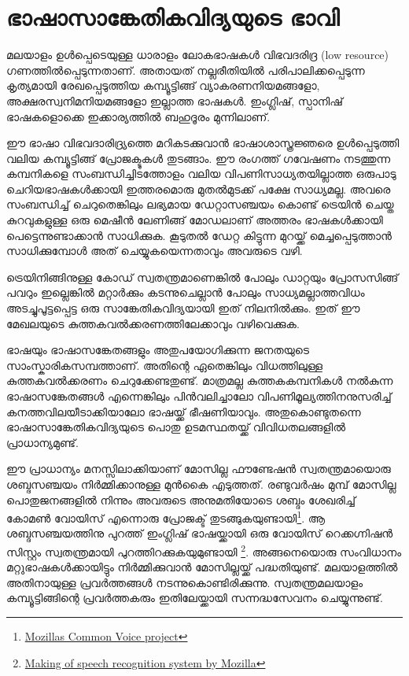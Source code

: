 \documentclass[12pt,twoside,a4paper]{article}
\begin{document}
\section{ഭാഷാസാങ്കേതികവിദ്യയുടെ ഭാവി}

മലയാളം ഉൾപ്പെടെയുള്ള ധാരാളം ലോകഭാഷകൾ വിഭവദരിദ്ര (low resource) ഗണത്തിൽപ്പെടുന്നതാണ്. അതായത് നല്ലരീതിയിൽ പരിപാലിക്കപ്പെടുന്ന കൃത്യമായി രേഖപ്പെടുത്തിയ കമ്പ്യൂട്ടിങ്ങ് വ്യാകരണനിയമങ്ങളോ, അക്ഷരസ്വനിമനിയമങ്ങളോ ഇല്ലാത്ത ഭാഷകൾ. ഇംഗ്ലിഷ്, സ്പാനിഷ് ഭാഷകളൊക്കെ ഇക്കാര്യത്തിൽ ബഹുദൂരം മുന്നിലാണ്.

ഈ ഭാഷാ വിഭവദാരിദ്ര്യത്തെ മറികടക്കുവാൻ ഭാഷാശാസ്ത്രജ്ഞരെ ഉൾപ്പെടുത്തി വലിയ കമ്പ്യൂട്ടിങ്ങ് പ്രോജക്ടുകൾ തുടങ്ങാം. ഈ രംഗത്ത് ഗവേഷണം നടത്തുന്ന കമ്പനികളെ സംബന്ധിച്ചിടത്തോളം വലിയ വിപണിസാധ്യതയില്ലാത്ത ഒരുപാടു ചെറിയഭാഷകൾക്കായി ഇത്തരമൊരു മുതൽമുടക്ക്  പക്ഷേ സാധ്യമല്ല. അവരെ സംബന്ധിച്ച് ചെറുതെങ്കിലും ലഭ്യമായ ഡേറ്റാസഞ്ചയം കൊണ്ട് ട്രെയിൻ ചെയ്ത കുറവുകളുള്ള ഒരു മെഷീൻ ലേണിങ്ങ്  മോഡലാണ് അത്തരം ഭാഷകൾക്കായി പെട്ടെന്നുണ്ടാക്കാൻ സാധിക്കുക. കൂടുതൽ ഡേറ്റ കിട്ടുന്ന മുറയ്ക്ക് മെച്ചപ്പെടുത്താൻ സാധിക്കുമ്പോൾ അത് ചെയ്യുകയെന്നതാവും അവരുടെ വഴി.

ട്രെയിനിങ്ങിനുള്ള കോഡ് സ്വതന്ത്രമാണെങ്കിൽ പോലും ഡാറ്റയും പ്രോസസിങ്ങ് പവറും ഇല്ലെങ്കിൽ മറ്റാർക്കും കടന്നുചെല്ലാൻ പോലും  സാധ്യമല്ലാത്തവിധം അടച്ചുപൂട്ടപ്പെട്ട ഒരു സാങ്കേതികവിദ്യയായി ഇത് നിലനിൽക്കും. ഇത് ഈ മേഖലയുടെ കുത്തകവൽക്കരണത്തിലേക്കാവും വഴിവെക്കുക.

ഭാഷയും ഭാഷാസങ്കേതങ്ങളും അതുപയോഗിക്കുന്ന ജനതയുടെ സാംസ്കാരികസമ്പത്താണ്. അതിന്റെ ഏതെങ്കിലും വിധത്തിലുള്ള കുത്തകവൽക്കരണം ചെറുക്കേണ്ടതുണ്ട്. മാത്രമല്ല കുത്തകകമ്പനികൾ നൽകുന്ന ഭാഷാസങ്കേതങ്ങൾ എന്നെങ്കിലും പിൻവലിച്ചാലോ വിപണിമൂല്യത്തിനനുസരിച്ച്  കനത്തവിലയീടാക്കിയാലോ ഭാഷയ്ക്ക് ഭീഷണിയാവും. അതുകൊണ്ടുതന്നെ ഭാഷാസാങ്കേതികവിദ്യയുടെ പൊതു ഉടമസ്ഥതയ്ക്ക് വിവിധതലങ്ങളിൽ പ്രാധാന്യമുണ്ട്.

ഈ പ്രാധാന്യം മനസ്സിലാക്കിയാണ് മോസില്ല ഫൗണ്ടേഷൻ സ്വതന്ത്രമായൊരു ശബ്ദസഞ്ചയം നിർമ്മിക്കാനുള്ള മുൻകൈ എടുത്തത്. രണ്ടുവർഷം മുമ്പ് മോസില്ല പൊതുജനങ്ങളിൽ നിന്നും അവരുടെ അനുമതിയോടെ ശബ്ദം ശേഖരിച്ച് കോമൺ വോയിസ് എന്നൊരു പ്രോജക്ട് തുടങ്ങുകയുണ്ടായി\footnote{\href{https://blog.mozilla.org/blog/2017/11/29/announcing-the-initial-release-of-mozillas-open-source-speech-recognition-model-and-voice-dataset/}{Mozillas Common Voice project}}. ആ ശബ്ദസഞ്ചയത്തിനു പുറത്ത് ഇംഗ്ലിഷ് ഭാഷയ്ക്കായി ഒരു വോയിസ് റെക്കഗ്നിഷൻ സിസ്റ്റം സ്വതന്ത്രമായി പുറത്തിറക്കുകയുമുണ്ടായി \footnote{\href{https://hacks.mozilla.org/2017/11/a-journey-to-10-word-error-rate/}{Making of speech recognition system by Mozilla}}. അങ്ങനെയൊരു സംവിധാനം മറ്റുഭാഷകൾക്കായിട്ടും നിർമ്മിക്കുവാൻ മോസില്ലയ്ക്ക് പദ്ധതിയുണ്ട്. മലയാളത്തിൽ അതിനായുള്ള പ്രവർത്തങ്ങൾ നടന്നുകൊണ്ടിരിക്കുന്നു. സ്വതന്ത്രമലയാളം കമ്പ്യൂട്ടിങ്ങിന്റെ പ്രവർത്തകരും ഇതിലേയ്ക്കായി സന്നദ്ധസേവനം ചെയ്യുന്നുണ്ട്.
\end{document}
